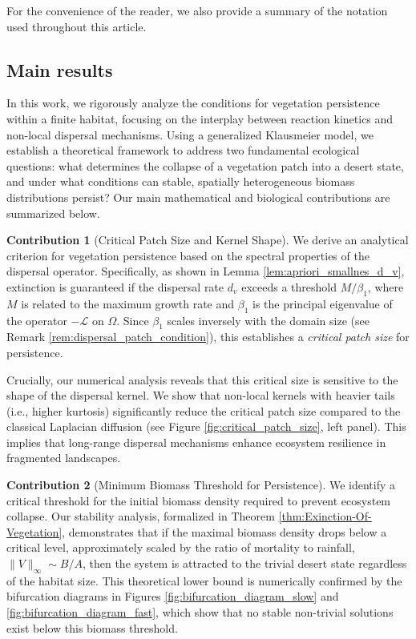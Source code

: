 \documentclass[preprint,12pt]{elsarticle}
\theoremstyle{plain}
\theoremstyle{definition}
\newtheorem{main_contrib}{Contribution}
\theoremstyle{remark}
\begin{document}
For the convenience of the reader, we also provide a summary of the notation used throughout this article.

\subsection{Main results}

In this work, we rigorously analyze the conditions for vegetation persistence within a finite habitat, focusing on the interplay between reaction kinetics and non-local dispersal mechanisms. Using a generalized Klausmeier model, we establish a theoretical framework to address two fundamental ecological questions: what determines the collapse of a vegetation patch into a desert state, and under what conditions can stable, spatially heterogeneous biomass distributions persist? Our main mathematical and biological contributions are summarized below.

\begin{main_contrib}[Critical Patch Size and Kernel Shape]
We derive an analytical criterion for vegetation persistence based on the spectral properties of the dispersal operator. Specifically, as shown in Lemma \ref{lem:apriori_smallnes_d_v}, extinction is guaranteed if the dispersal rate $d_v$ exceeds a threshold $M/\beta_1$, where $M$ is related to the maximum growth rate and $\beta_1$ is the principal eigenvalue of the operator $-\mathcal{L}$ on $\Omega$. Since $\beta_1$ scales inversely with the domain size (see Remark \ref{rem:dispersal_patch_condition}), this establishes a \textit{critical patch size} for persistence. 

Crucially, our numerical analysis reveals that this critical size is sensitive to the shape of the dispersal kernel. We show that non-local kernels with heavier tails (i.e., higher kurtosis) significantly reduce the critical patch size compared to the classical Laplacian diffusion (see Figure \ref{fig:critical_patch_size}, left panel). This implies that long-range dispersal mechanisms enhance ecosystem resilience in fragmented landscapes.
\end{main_contrib}

\begin{main_contrib}[Minimum Biomass Threshold for Persistence]
We identify a critical threshold for the initial biomass density required to prevent ecosystem collapse. Our stability analysis, formalized in Theorem \ref{thm:Exinction-Of-Vegetation}, demonstrates that if the maximal biomass density drops below a critical level, approximately scaled by the ratio of mortality to rainfall, $\|V\|_\infty \sim B/A$, then the system is attracted to the trivial desert state regardless of the habitat size. This theoretical lower bound is numerically confirmed by the bifurcation diagrams in Figures \ref{fig:bifurcation_diagram_slow} and \ref{fig:bifurcation_diagram_fast}, which show that no stable non-trivial solutions exist below this biomass threshold.
\end{main_contrib}
\end{document}
